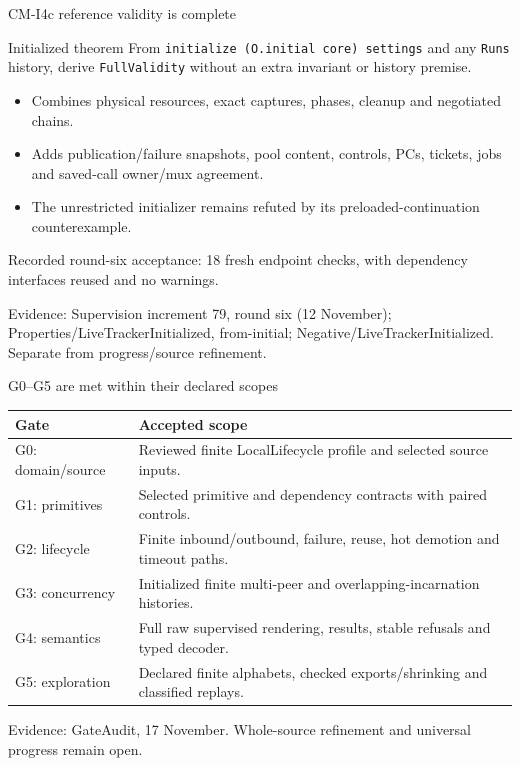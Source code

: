 \documentclass[11pt,aspectratio=169]{beamer}
\newcommand{\evidence}[1]{\vfill{\fontsize{7}{8}\selectfont\color{Muted}Evidence: #1\par}}
\begin{document}
\begin{frame}{CM-I4c reference validity is complete}
\begin{block}{Initialized theorem}
From \texttt{initialize (O.initial core) settings} and any \texttt{Runs} history, derive \texttt{FullValidity} without an extra invariant or history premise.
\end{block}\begin{itemize}\setlength\itemsep{2.5mm}
\item Combines physical resources, exact captures, phases, cleanup and negotiated chains.
\item Adds publication/failure snapshots, pool content, controls, PCs, tickets, jobs and saved-call owner/mux agreement.
\item The unrestricted initializer remains refuted by its preloaded-continuation counterexample.
\end{itemize}\small Recorded round-six acceptance: 18 fresh endpoint checks, with dependency interfaces reused and no warnings.
\evidence{Supervision increment 79, round six (12 November); Properties/LiveTrackerInitialized, from-initial; Negative/LiveTrackerInitialized. Separate from progress/source refinement.}
\end{frame}

\begin{frame}{G0--G5 are met within their declared scopes}
\small\renewcommand{\arraystretch}{1.2}
\begin{tabularx}{\textwidth}{@{}P{28mm}Y@{}}
\toprule
Gate & Accepted scope \\ \midrule
G0: domain/source & Reviewed finite LocalLifecycle profile and selected source inputs. \\[2mm]
G1: primitives & Selected primitive and dependency contracts with paired controls. \\[2mm]
G2: lifecycle & Finite inbound/outbound, failure, reuse, hot demotion and timeout paths. \\[2mm]
G3: concurrency & Initialized finite multi-peer and overlapping-incarnation histories. \\[2mm]
G4: semantics & Full raw supervised rendering, results, stable refusals and typed decoder. \\[2mm]
G5: exploration & Declared finite alphabets, checked exports/shrinking and classified replays. \\[2mm]
\bottomrule
\end{tabularx}
\evidence{GateAudit, 17 November. Whole-source refinement and universal progress remain open.}
\end{frame}
\end{document}
